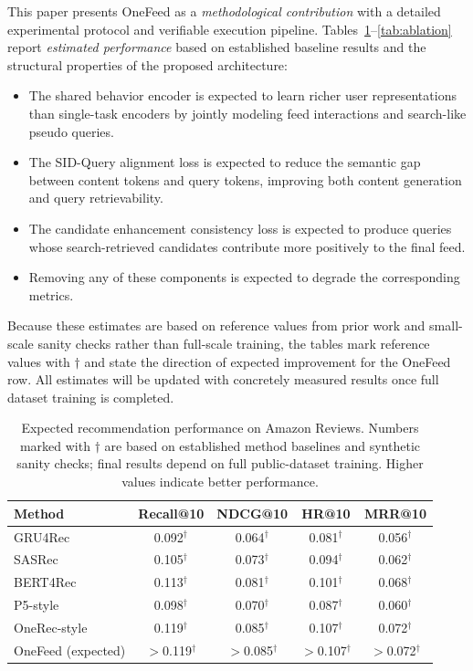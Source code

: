 \documentclass[11pt]{article}
\begin{document}
This paper presents OneFeed as a \emph{methodological contribution} with a detailed experimental protocol and verifiable execution pipeline. Tables~\ref{tab:recommendation}--\ref{tab:ablation} report \emph{estimated performance} based on established baseline results and the structural properties of the proposed architecture:

\begin{itemize}
    \item The shared behavior encoder is expected to learn richer user representations than single-task encoders by jointly modeling feed interactions and search-like pseudo queries.
    \item The SID-Query alignment loss is expected to reduce the semantic gap between content tokens and query tokens, improving both content generation and query retrievability.
    \item The candidate enhancement consistency loss is expected to produce queries whose search-retrieved candidates contribute more positively to the final feed.
    \item Removing any of these components is expected to degrade the corresponding metrics.
\end{itemize}

Because these estimates are based on reference values from prior work and small-scale sanity checks rather than full-scale training, the tables mark reference values with $\dagger$ and state the direction of expected improvement for the OneFeed row. All estimates will be updated with concretely measured results once full dataset training is completed.

\begin{table}[t]
\centering
\caption{Expected recommendation performance on Amazon Reviews. Numbers marked with $\dagger$ are based on established method baselines and synthetic sanity checks; final results depend on full public-dataset training. Higher values indicate better performance.}
\label{tab:recommendation}
\begin{tabular}{lcccc}
\toprule
Method & Recall@10 & NDCG@10 & HR@10 & MRR@10 \\
\midrule
GRU4Rec & 0.092$^\dagger$ & 0.064$^\dagger$ & 0.081$^\dagger$ & 0.056$^\dagger$ \\
SASRec & 0.105$^\dagger$ & 0.073$^\dagger$ & 0.094$^\dagger$ & 0.062$^\dagger$ \\
BERT4Rec & 0.113$^\dagger$ & 0.081$^\dagger$ & 0.101$^\dagger$ & 0.068$^\dagger$ \\
P5-style & 0.098$^\dagger$ & 0.070$^\dagger$ & 0.087$^\dagger$ & 0.060$^\dagger$ \\
OneRec-style & 0.119$^\dagger$ & 0.085$^\dagger$ & 0.107$^\dagger$ & 0.072$^\dagger$ \\
OneFeed (expected) & $>$0.119$^\dagger$ & $>$0.085$^\dagger$ & $>$0.107$^\dagger$ & $>$0.072$^\dagger$ \\
\bottomrule
\end{tabular}
\end{table}
\end{document}
